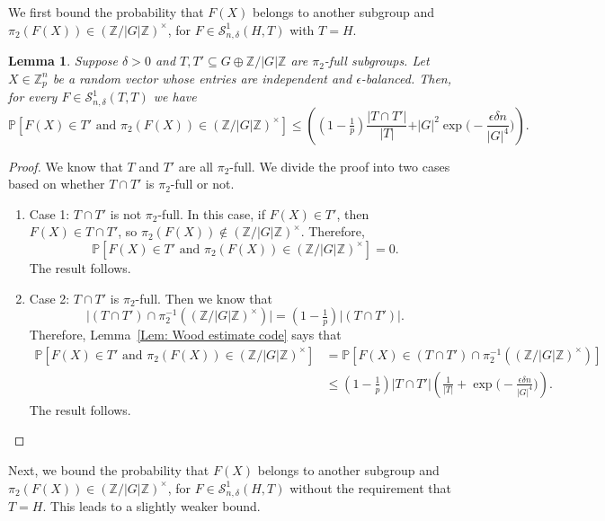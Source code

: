 \documentclass[12pt]{amsart}
\newtheorem{lemma}[theorem]{Lemma}
\theoremstyle{definition}
\newcommand{\PPP}{\mathbb{P}}
\newcommand{\SSO}[3]{\mathcal{S}^1_{#1}(#2,#3)}
\newcommand{\ZG}{\Z/\abs{G}\Z}
\newcommand{\abs}[1]{\vert#1\vert}
\newcommand{\Zp}{\Z_p}
\newcommand{\Z}{\mathbb{Z}}
\begin{document}
We first bound the probability that $F(X)$ belongs to another subgroup and $\pi_2(F(X))\in (\ZG)^{\times}$, for $F\in\SSO{n,\delta}{H}{T}$ with $T=H$.


\begin{lemma}\label{Lem: bound subgroup, pi_2 full, code}
Suppose $\delta>0$ and $T, T'\subseteq G\oplus\ZG$ are $\pi_2$-full subgroups.
Let $X\in\Zp^n$ be a random vector whose entries are independent and $\epsilon$-balanced.
Then, for every $F\in\SSO{n,\delta}{T}{T}$ we have
\[
\PPP[F(X)\in T' \text{ and } \pi_2(F(X))\in (\ZG)^{\times}]
\leq 
 \left( (1-\tfrac{1}{p}) \frac{\abs{T\cap T'}}{\abs{T}}
 +\abs{G}^2\exp\Big(-\frac{\epsilon\delta n}{|G|^4}\Big) \right).
\]
\end{lemma}
\begin{proof}
We know that $T$ and $T'$ are all $\pi_2$-full.
We divide the proof into two cases based on whether $T\cap T'$ is $\pi_2$-full or not.

\begin{enumerate}
    \item Case 1: $T\cap T'$ is not $\pi_2$-full. In this case, if $F(X)\in T'$, then $F(X)\in T\cap T'$, so $\pi_2(F(X))\notin (\ZG)^{\times}$. Therefore,
    \[
    \PPP[F(X)\in T' \text{ and } \pi_2(F(X))\in (\ZG)^{\times}]
    =0.
    \]
    The result follows.

    \item Case 2: $T\cap T'$ is $\pi_2$-full. Then we know that
    \[
    \abs{(T\cap T')\cap \pi_2^{-1}((\ZG)^{\times}) }
    = (1-\tfrac{1}{p}) \abs{(T\cap T')}.
    \]
    Therefore, Lemma~\ref{Lem: Wood estimate code} says that
    \begin{align*}
    \PPP[F(X)\in T' \text{ and } \pi_2(F(X))\in (\ZG)^{\times}]
    &=\PPP[F (X) \in (T\cap T')\cap \pi_2^{-1}((\ZG)^{\times})]\\
    &\leq (1-\tfrac{1}{p}) \abs{T\cap T'} \left(\frac{1}{\abs{T}}
    +\exp\Big(-\frac{\epsilon \delta n}{|G|^4}\Big) \right).
    \end{align*}
    The result follows.\qedhere
\end{enumerate}
\end{proof}

Next, we bound the probability that $F(X)$ belongs to another subgroup and $\pi_2(F(X))\in (\ZG)^{\times}$, for $F\in\SSO{n,\delta}{H}{T}$ without the requirement that $T=H$. This leads to a slightly weaker bound.
\end{document}

